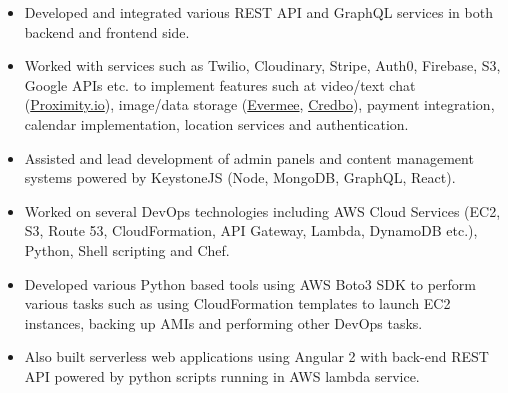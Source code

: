 \documentclass[10pt,a4paper,ragged2e]{maltacv}
\begin{document}
\begin{itemize}
  \item Developed and integrated various REST API and GraphQL services in both backend and frontend side.
  \item Worked with services such as Twilio, Cloudinary, Stripe, Auth0, Firebase, S3, Google APIs etc. to implement features such at video/text chat (\href{https://prox.io/}{Proximity.io}), image/data storage (\href{https://play.google.com/store/apps/details?id=com.evermee}{Evermee}, \href{https://www.credbo.com/}{Credbo}), payment integration, calendar implementation, location services and authentication.  
  \item Assisted and lead development of admin panels and content management systems powered by KeystoneJS (Node, MongoDB, GraphQL, React).
\end{itemize}

\divider

\begin{itemize}
  \item Worked on several DevOps technologies including AWS Cloud Services (EC2, S3, Route 53, CloudFormation, API Gateway, Lambda, DynamoDB etc.), Python, Shell scripting and Chef. 
  \item Developed various Python based tools using AWS Boto3 SDK to perform various tasks such as using CloudFormation templates to launch EC2 instances, backing up AMIs and performing other DevOps tasks. 
  \item Also built serverless web applications using Angular 2 with back-end REST API powered by python scripts running in AWS lambda service.
\end{itemize}

\divider
\medskip

\end{document}

